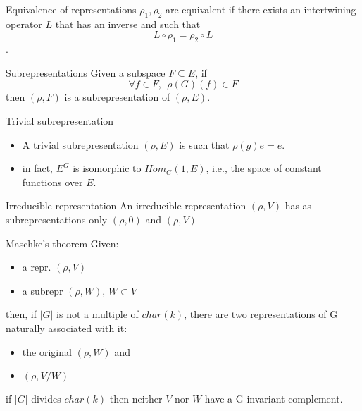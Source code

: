 \documentclass[presentation]{beamer}
\begin{document}
\begin{frame}[label={sec:org4cf5bba}]{Equivalence of representations}
\(\rho_1, \rho_2\) are equivalent if there exists an intertwining operator \(L\)
that has an inverse and such that $$L \circ \rho_1 = \rho_2 \circ L$$.
\end{frame}

\begin{frame}[label={sec:org6dd29b5}]{Subrepresentations}
Given a subspace \(F \subseteq E\), if $$\forall f \in F, ~~\rho(G)(f) \in
     F$$ then \((\rho, F)\) is a \alert{subrepresentation} of \((\rho, E)\).
\end{frame}

\begin{frame}[label={sec:org6b4fb18}]{Trivial subrepresentation}
\begin{itemize}
\item A trivial subrepresentation \((\rho, E)\) is such that \(\rho(g)e = e\).

\item in fact, \(E^G\) is isomorphic to \(Hom_G(1,E)\), i.e., the space of constant functions
over \(E\).
\end{itemize}
\end{frame}

\begin{frame}[label={sec:org5f30b89}]{Irreducible representation}
An \alert{irreducible} representation \((\rho,V)\) has as subrepresentations only
\((\rho,0)\) and \((\rho,V)\)
\end{frame}

\begin{frame}[label={sec:org4886b4d}]{Maschke's theorem}
Given:
\begin{itemize}
\item a repr. \((\rho,V)\)
\item a subrepr \((\rho, W)\), \(W \subset V\)
\end{itemize}

then, if \(|G|\) is not a multiple of \(char(k)\), there are two representations
of G naturally associated with it:

\begin{itemize}
\item the original \((\rho, W)\) and
\item \((\rho, V/W)\)
\end{itemize}

if \(|G|\) divides \(char(k)\) then neither \(V\) nor \(W\) have a G-invariant
complement.
\end{frame}
\end{document}
